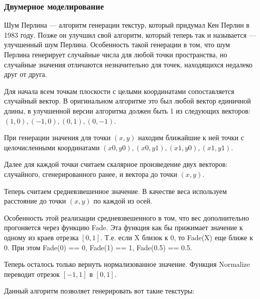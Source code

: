 \documentclass[14pt, a4paper]{extarticle}
\begin{document}
\subsubsection{Двумерное моделирование}
Шум Перлина — алгоритм генерации текстур, который придумал Кен Перлин в 1983 году. Позже он улучшил свой алгоритм, который теперь так и называется — улучшенный шум Перлина. Особенность такой генерации в том, что шум Перлина генерирует случайные числа для любой точки пространства, но случайные значения отличаются незначительно для точек, находящихся недалеко друг от друга.\par
Для начала всем точкам плоскости с целыми координатами сопоставляется случайный вектор. В оригинальном алгоритме это был любой вектор единичной длины, в улучшенной версии алгоритма должен быть 1 из следующих векторов: $(1, 0), (-1, 0), (0, 1), (0, -1)$.\par
При генерации значения для точки $(x, y)$ находим ближайшие к ней точки с целочисленными координатами $(x0, y0), (x0, y1), (x1, y0), (x1, y1)$.\par
Далее для каждой точки считаем скалярное произведение двух векторов: случайного, сгенерированного ранее, и вектора до точки $(x, y)$.\par
Теперь считаем средневзвешенное значение. В качестве веса используем расстояние до точки $(x, y)$ по каждой из осей.\par
Особенность этой реализации средневзвешенного в том, что вес дополнительно прогоняется через функцию Fade. Эта функция как бы прижимает значение к одному из краев отрезка $[0, 1]$. Т.е. если X близок к 0, то Fade(X) еще ближе к 0. При этом Fade(0) == 0, Fade(1) == 1, Fade(0.5) == 0.5.\par
Теперь осталось только вернуть нормализованное значение. Функция Normalize переводит отрезок $[-1, 1]$ в $[0, 1]$.\par
Данный алгоритм позволяет генерировать вот такие текстуры:
\end{document}
